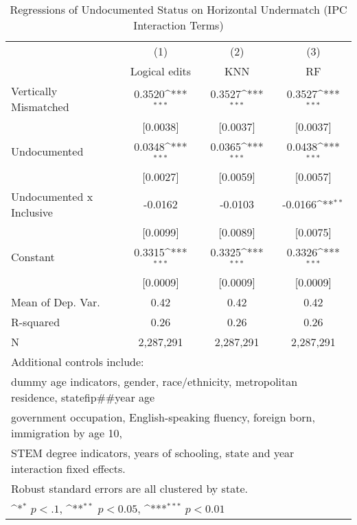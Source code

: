 \begin{table}[htbp]\centering
\def\sym#1{\ifmmode^{#1}\else\(^{#1}\)\fi}
\caption{Regressions of Undocumented Status on Horizontal Undermatch (IPC Interaction Terms)}
\begin{tabular}{l*{3}{c}}
\toprule
                    &\multicolumn{1}{c}{(1)}         &\multicolumn{1}{c}{(2)}         &\multicolumn{1}{c}{(3)}         \\
                    &Logical edits         &         KNN         &          RF         \\
\midrule
Vertically Mismatched&      0.3520\sym{***}&      0.3527\sym{***}&      0.3527\sym{***}\\
                    &    [0.0038]         &    [0.0037]         &    [0.0037]         \\
\addlinespace
Undocumented        &      0.0348\sym{***}&      0.0365\sym{***}&      0.0438\sym{***}\\
                    &    [0.0027]         &    [0.0059]         &    [0.0057]         \\
\addlinespace
Undocumented x Inclusive&     -0.0162         &     -0.0103         &     -0.0166\sym{**} \\
                    &    [0.0099]         &    [0.0089]         &    [0.0075]         \\
\addlinespace
Constant            &      0.3315\sym{***}&      0.3325\sym{***}&      0.3326\sym{***}\\
                    &    [0.0009]         &    [0.0009]         &    [0.0009]         \\
\midrule
Mean of Dep. Var.   &        0.42         &        0.42         &        0.42         \\
R-squared           &        0.26         &        0.26         &        0.26         \\
N                   &   2,287,291         &   2,287,291         &   2,287,291         \\
\bottomrule
\multicolumn{4}{l}{\footnotesize Additional controls include:}\\
\multicolumn{4}{l}{\footnotesize dummy age indicators, gender, race/ethnicity, metropolitan residence, statefip##year age}\\
\multicolumn{4}{l}{\footnotesize government occupation, English-speaking fluency, foreign born, immigration by age 10,}\\
\multicolumn{4}{l}{\footnotesize STEM degree indicators, years of schooling, state and year interaction fixed effects.}\\
\multicolumn{4}{l}{\footnotesize Robust standard errors are all clustered by state.}\\
\multicolumn{4}{l}{\footnotesize \sym{*} \(p<.1\), \sym{**} \(p<0.05\), \sym{***} \(p<0.01\)}\\
\end{tabular}
\end{table}
